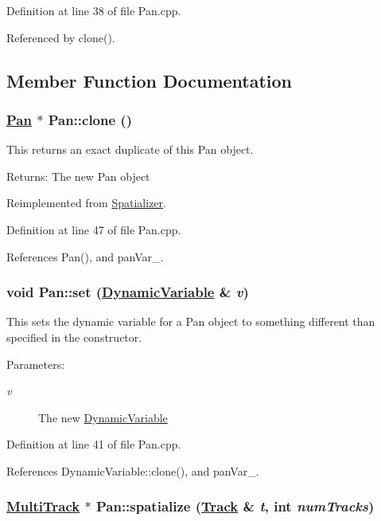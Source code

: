 Definition at line 38 of file Pan.cpp.

Referenced by clone().

\subsection{Member Function Documentation}
\hypertarget{classPan_a1}{
\subsubsection[clone]{\setlength{\rightskip}{0pt plus 5cm}\hyperlink{classPan}{Pan} $\ast$ Pan::clone ()}}
\label{classPan_a1}


This returns an exact duplicate of this Pan object. \begin{Desc}
\item[Returns:]The new Pan object \end{Desc}


Reimplemented from \hyperlink{classSpatializer_a1}{Spatializer}.

Definition at line 47 of file Pan.cpp.

References Pan(), and pan\-Var\_\-.\hypertarget{classPan_a2}{
\subsubsection[set]{\setlength{\rightskip}{0pt plus 5cm}void Pan::set (\hyperlink{classDynamicVariable}{Dynamic\-Variable} \& {\em v})}}
\label{classPan_a2}


This sets the dynamic variable for a Pan object to something different than specified in the constructor. \begin{Desc}
\item[Parameters:]
\begin{description}
\item[{\em v}]The new \hyperlink{classDynamicVariable}{Dynamic\-Variable} \end{description}
\end{Desc}


Definition at line 41 of file Pan.cpp.

References Dynamic\-Variable::clone(), and pan\-Var\_\-.\hypertarget{classPan_a3}{
\subsubsection[spatialize]{\setlength{\rightskip}{0pt plus 5cm}\hyperlink{classMultiTrack}{Multi\-Track} $\ast$ Pan::spatialize (\hyperlink{classTrack}{Track} \& {\em t}, int {\em num\-Tracks})}}
\label{classPan_a3}


